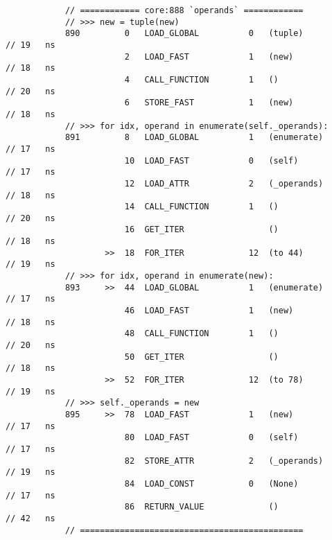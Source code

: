 \begin{code}
\begin{verbatim}
            // ============ core:888 `operands` ============
            // >>> new = tuple(new)
            890         0   LOAD_GLOBAL          0   (tuple)                                        // 19   ns
                        2   LOAD_FAST            1   (new)                                          // 18   ns
                        4   CALL_FUNCTION        1   ()                                             // 20   ns
                        6   STORE_FAST           1   (new)                                          // 18   ns
            // >>> for idx, operand in enumerate(self._operands):
            891         8   LOAD_GLOBAL          1   (enumerate)                                    // 17   ns
                        10  LOAD_FAST            0   (self)                                         // 17   ns
                        12  LOAD_ATTR            2   (_operands)                                    // 18   ns
                        14  CALL_FUNCTION        1   ()                                             // 20   ns
                        16  GET_ITER                 ()                                             // 18   ns
                    >>  18  FOR_ITER             12  (to 44)                                        // 19   ns
            // >>> for idx, operand in enumerate(new):
            893     >>  44  LOAD_GLOBAL          1   (enumerate)                                    // 17   ns
                        46  LOAD_FAST            1   (new)                                          // 18   ns
                        48  CALL_FUNCTION        1   ()                                             // 20   ns
                        50  GET_ITER                 ()                                             // 18   ns
                    >>  52  FOR_ITER             12  (to 78)                                        // 19   ns
            // >>> self._operands = new
            895     >>  78  LOAD_FAST            1   (new)                                          // 17   ns
                        80  LOAD_FAST            0   (self)                                         // 17   ns
                        82  STORE_ATTR           2   (_operands)                                    // 19   ns
                        84  LOAD_CONST           0   (None)                                         // 17   ns
                        86  RETURN_VALUE             ()                                             // 42   ns
            // =============================================


\end{verbatim}
\end{code}
